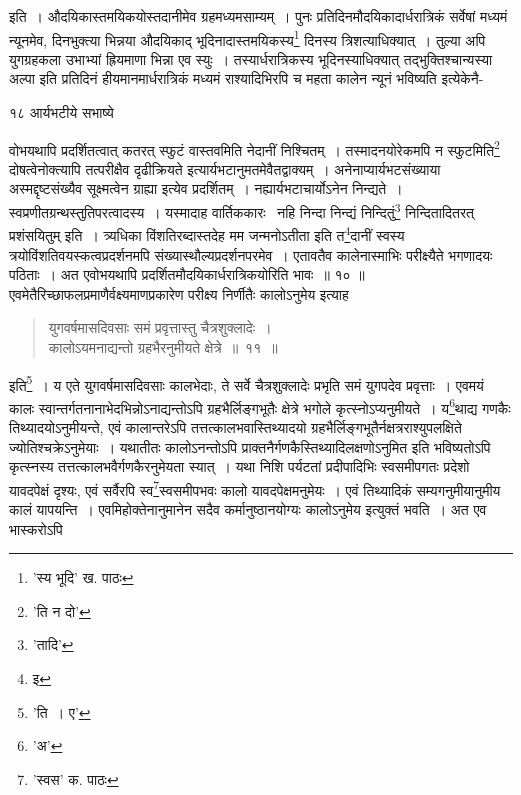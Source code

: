 \documentclass[11pt, openany]{book}
\begin{document}
{\noindent इति~। औदयिकास्तमयिकयोस्तदानीमेव ग्रहमध्यमसाम्यम्~। पुनः प्रतिदिनमौदयिकादार्धरात्रिकं सर्वेषां मध्यमं न्यूनमेव, दिनभुक्त्या भिन्नया औदयिकाद् भूदिनादास्तमयिकस्य\renewcommand{\thefootnote}{४}\footnote{'स्य भूदि' ख. पाठः} दिनस्य त्रिशत्याधिक्यात्~। तुल्या अपि युगग्रहकला उभाभ्यां ह्रियमाणा भिन्ना एव स्युः~। तस्यार्धरात्रिकस्य भूदिनस्याधिक्यात् तद्भुक्तिश्चान्यस्या अल्पा इति प्रतिदिनं हीयमानमार्धरात्रिकं मध्यमं राश्यादिभिरपि च महता कालेन न्यूनं भविष्यति इत्येकेनै-


\newpage

\vspace{3cm} १८ \hspace{4cm}आर्यभटीये सभाष्ये 

\vspace{0.3cm}
\noindent वोभयथापि प्रदर्शितत्वात् कतरत् स्फुटं वास्तवमिति नेदानीं निश्चितम्~। तस्मादनयोरेकमपि न स्फुटमिति\renewcommand{\thefootnote}{१}\footnote{'ति न दो'} दोषत्वेनोक्त्यापि तत्परीक्षैव दृढीक्रियते इत्यार्यभटानुमतमेवैतद्वाक्यम्~। अनेनाप्यार्यभटसंख्याया अस्मद्दृष्टसंख्यैव सूक्ष्मत्वेन ग्राह्या इत्येव प्रदर्शितम्~। नह्यार्यभटाचार्योऽनेन
निन्द्यते~। स्वप्रणीतग्रन्थस्तुतिपरत्वादस्य~। यस्मादाह वार्तिककारः \textendash\ {\qt नहि निन्दा निन्द्यं निन्दितुं\renewcommand{\thefootnote}{२}\footnote{'तादि'} निन्दितादितरत् प्रशंसयितुम्} इति~। {\qt त्र्यधिका
विंशतिरब्दास्तदेह मम जन्मनोऽतीता} इति त\renewcommand{\thefootnote}{३}\footnote{इ}दानीं स्वस्य
त्रयोविंशतिवयस्कत्वप्रदर्शनमपि संख्यास्थौल्यप्रदर्शनपरमेव~। एतावतैव कालेनास्माभिः परीक्ष्यैते भगणादयः पठिताः~। अत एवोभयथापि प्रदर्शितमौदयिकार्धरात्रिकयोरिति भावः~॥ १० ॥ \\

एवमेतैरिच्छाफलप्रमाणैर्वक्ष्यमाणप्रकारेण परीक्ष्य निर्णीतैः कालोऽनुमेय इत्याह\textendash
\vspace{-5mm}
\begin{quote}
{\ab युगवर्षमासदिवसाः समं प्रवृत्तास्तु चैत्रशुक्लादेः~।\\
कालोऽयमनाद्यन्तो ग्रहभैरनुमीयते क्षेत्रे~॥~११~॥}
\end{quote}

इति\renewcommand{\thefootnote}{४}\footnote{'ति~। ए'}~। य एते युगवर्षमासदिवसाः कालभेदाः, ते सर्वे चैत्रशुक्लादेः प्रभृति समं युगपदेव प्रवृत्ताः~। एवमयं कालः स्वान्तर्गतनानाभेदभिन्नोऽनाद्यन्तोऽपि ग्रहभैर्लिङ्गभूतैः क्षेत्रे भगोले कृत्स्नोऽप्यनुमीयते~।
य\renewcommand{\thefootnote}{५}\footnote{'अ'}थाद्य गणकैः तिथ्यादयोऽनुमीयन्ते, एवं कालान्तरेऽपि तत्तत्कालभवास्तिथ्यादयो ग्रहभैर्लिङ्गभूतैर्नक्षत्रराश्युपलक्षिते ज्योतिश्चक्रेऽनुमेयाः~। यथातीतः कालोऽनन्तोऽपि प्राक्तनैर्गणकैस्तिथ्यादिलक्षणोऽनुमित इति भविष्यतोऽपि कृत्स्नस्य तत्तत्कालभवैर्गणकैरनुमेयता स्यात्~। यथा निशि पर्यटतां प्रदीपादिभिः स्वसमीपगतः प्रदेशो यावदपेक्षं दृश्यः, एवं सर्वैरपि स्व\renewcommand{\thefootnote}{६}\footnote{'स्वस' क. पाठः}स्वसमीपभवः कालो यावदपेक्षमनुमेयः~। एवं तिथ्यादिकं सम्यगनुमीयानुमीय कालं यापयन्ति~। एवमिहोक्तेनानुमानेन सदैव कर्मानुष्ठानयोग्यः कालोऽनुमेय इत्युक्तं भवति~। अत एव भास्करोऽपि\textendash

}
\end{document}
